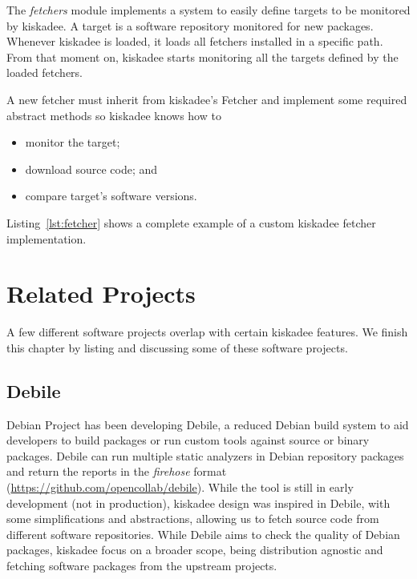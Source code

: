 The \emph{fetchers} module implements a system to easily define targets to be
monitored by kiskadee. A target is a software repository monitored for new
packages. Whenever kiskadee is loaded, it loads all fetchers installed in a
specific path. From that moment on, kiskadee starts monitoring all the targets
defined by the loaded fetchers.

A new fetcher must inherit from kiskadee's Fetcher and implement some required
abstract methods so kiskadee knows how to

\begin{itemize}
  \item monitor the target;
  \item download source code; and
  \item compare target's software versions.
\end{itemize}

Listing~\ref{lst:fetcher} shows a complete example of a custom kiskadee fetcher implementation.

\begin{minipage}{\linewidth}

\end{minipage}

\section{Related Projects}
\label{sec:related_projects}

A few different software projects overlap with certain kiskadee features. We
finish this chapter by listing and discussing some of these software projects.

\subsection{Debile}

Debian Project has been developing Debile, a reduced Debian build system to aid
developers to build packages or run custom tools against source or binary
packages.  Debile can run multiple static analyzers in Debian repository
packages and return the reports in the \textit{firehose}
format (\url{https://github.com/opencollab/debile}). While the tool is
still in early development (not in production), kiskadee design was inspired in
Debile, with some simplifications and abstractions, allowing us to fetch source
code from different software repositories. While Debile aims to check the
quality of Debian packages, kiskadee focus on a broader scope, being
distribution agnostic and fetching software packages from the upstream projects.

